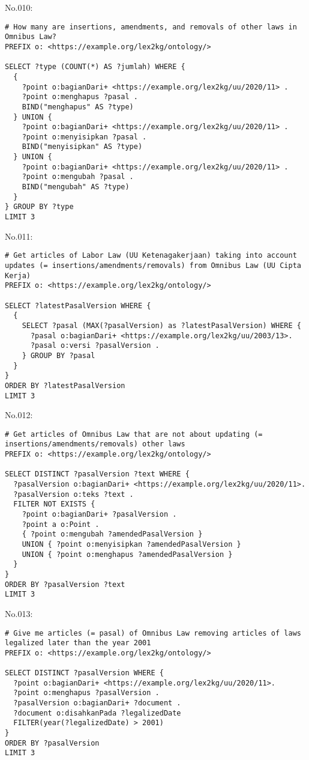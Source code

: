 \noindent No.010:
\begin{lstlisting}
# How many are insertions, amendments, and removals of other laws in Omnibus Law?
PREFIX o: <https://example.org/lex2kg/ontology/>

SELECT ?type (COUNT(*) AS ?jumlah) WHERE {
  {
    ?point o:bagianDari+ <https://example.org/lex2kg/uu/2020/11> .
    ?point o:menghapus ?pasal .
    BIND("menghapus" AS ?type)
  } UNION {
    ?point o:bagianDari+ <https://example.org/lex2kg/uu/2020/11> .
    ?point o:menyisipkan ?pasal .
    BIND("menyisipkan" AS ?type)
  } UNION {
    ?point o:bagianDari+ <https://example.org/lex2kg/uu/2020/11> .
    ?point o:mengubah ?pasal .
    BIND("mengubah" AS ?type)
  }
} GROUP BY ?type
LIMIT 3

\end{lstlisting}


\noindent No.011:
\begin{lstlisting}
# Get articles of Labor Law (UU Ketenagakerjaan) taking into account updates (= insertions/amendments/removals) from Omnibus Law (UU Cipta Kerja)
PREFIX o: <https://example.org/lex2kg/ontology/>

SELECT ?latestPasalVersion WHERE {
  {
    SELECT ?pasal (MAX(?pasalVersion) as ?latestPasalVersion) WHERE {
      ?pasal o:bagianDari+ <https://example.org/lex2kg/uu/2003/13>.
      ?pasal o:versi ?pasalVersion .
    } GROUP BY ?pasal
  }
}
ORDER BY ?latestPasalVersion
LIMIT 3
\end{lstlisting}


\noindent No.012:
\begin{lstlisting}
# Get articles of Omnibus Law that are not about updating (= insertions/amendments/removals) other laws
PREFIX o: <https://example.org/lex2kg/ontology/>

SELECT DISTINCT ?pasalVersion ?text WHERE {
  ?pasalVersion o:bagianDari+ <https://example.org/lex2kg/uu/2020/11>.
  ?pasalVersion o:teks ?text .
  FILTER NOT EXISTS {
    ?point o:bagianDari+ ?pasalVersion . 
    ?point a o:Point .
    { ?point o:mengubah ?amendedPasalVersion }
    UNION { ?point o:menyisipkan ?amendedPasalVersion } 
    UNION { ?point o:menghapus ?amendedPasalVersion }
  }
}
ORDER BY ?pasalVersion ?text
LIMIT 3
\end{lstlisting}


\noindent No.013:
\begin{lstlisting}
# Give me articles (= pasal) of Omnibus Law removing articles of laws legalized later than the year 2001
PREFIX o: <https://example.org/lex2kg/ontology/>

SELECT DISTINCT ?pasalVersion WHERE {
  ?point o:bagianDari+ <https://example.org/lex2kg/uu/2020/11>.
  ?point o:menghapus ?pasalVersion .
  ?pasalVersion o:bagianDari+ ?document .
  ?document o:disahkanPada ?legalizedDate
  FILTER(year(?legalizedDate) > 2001)
}
ORDER BY ?pasalVersion
LIMIT 3
\end{lstlisting}


